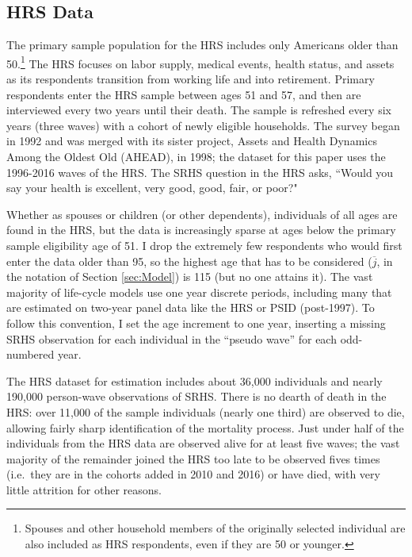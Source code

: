 \documentclass[12pt,pdftex,letterpaper]{article}
\newcommand{\Age}{j}
\newcommand{\AgeMax}{\overline{\Age}}
\begin{document}
\subsection{HRS Data}\label{sec:HRS}

The primary sample population for the HRS includes only Americans older than 50.\footnote{Spouses and other household members of the originally selected individual are also included as HRS respondents, even if they are 50 or younger.}  The HRS focuses on labor supply, medical events, health status, and assets as its respondents transition from working life and into retirement.  Primary respondents enter the HRS sample between ages 51 and 57, and then are interviewed every two years until their death.  The sample is refreshed every six years (three waves) with a cohort of newly eligible households.  The survey began in 1992 and was merged with its sister project, Assets and Health Dynamics Among the Oldest Old (AHEAD), in 1998; the dataset for this paper uses the 1996-2016 waves of the HRS. The SRHS question in the HRS asks, ``Would you say your health is excellent, very good, good, fair, or poor?"

Whether as spouses or children (or other dependents), individuals of all ages are found in the HRS, but the data is increasingly sparse at ages below the primary sample eligibility age of 51.  I drop the extremely few respondents who would first enter the data older than 95, so the highest age that has to be considered ($\AgeMax$, in the notation of Section \ref{sec:Model}) is 115 (but no one attains it). The vast majority of life-cycle models use one year discrete periods, including many that are estimated on two-year panel data like the HRS or PSID (post-1997).  To follow this convention, I set the age increment to one year, inserting a missing SRHS observation for each individual in the ``pseudo wave'' for each odd-numbered year.

The HRS dataset for estimation includes about 36,000 individuals and nearly 190,000 person-wave observations of SRHS. There is no dearth of death in the HRS: over 11,000 of the sample individuals (nearly one third) are observed to die, allowing fairly sharp identification of the mortality process.  Just under half of the individuals from the HRS data are observed alive for at least five waves; the vast majority of the remainder joined the HRS too late to be observed fives times (i.e.\ they are in the cohorts added in 2010 and 2016) or have died, with very little attrition for other reasons.
\end{document}
